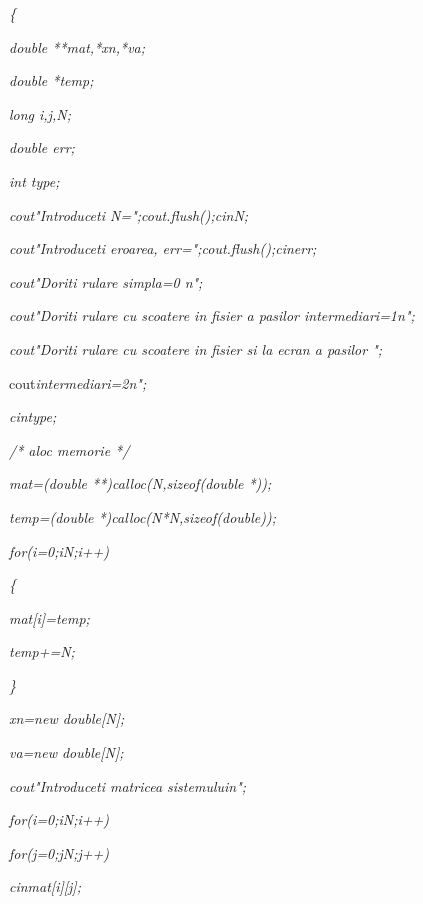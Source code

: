 \documentclass[a4paper,twoside]{book}
\begin{document}
\textit{\{}

\textit{\qquad double **mat,*xn,*va;}

\textit{\qquad double *temp;}

\textit{\qquad long i,j,N;}

\textit{\qquad double err;}

\textit{\qquad int type;}

\textit{\qquad cout\TEXTsymbol{<}\TEXTsymbol{<}"Introduceti
N=";cout.flush();cin\TEXTsymbol{>}\TEXTsymbol{>}N;}

\textit{\qquad cout\TEXTsymbol{<}\TEXTsymbol{<}"Introduceti eroarea,
err=";cout.flush();cin\TEXTsymbol{>}\TEXTsymbol{>}err;}

\textit{\qquad cout\TEXTsymbol{<}\TEXTsymbol{<}"Doriti rulare simpla=0%
\TEXTsymbol{\backslash}n";}

\textit{\qquad cout\TEXTsymbol{<}\TEXTsymbol{<}"Doriti rulare cu scoatere in
fisier a pasilor intermediari=1\TEXTsymbol{\backslash}n";}

\textit{\qquad cout\TEXTsymbol{<}\TEXTsymbol{<}"Doriti rulare cu scoatere in
fisier si la ecran a pasilor ";}

\qquad cout\TEXTsymbol{<}\TEXTsymbol{<}\textit{intermediari=2\TEXTsymbol{%
\backslash}n";}

\textit{\qquad cin\TEXTsymbol{>}\TEXTsymbol{>}type;}

\textit{\qquad /* aloc memorie */}

\textit{\qquad mat=(double **)calloc(N,sizeof(double *));}

\textit{\qquad temp=(double *)calloc(N*N,sizeof(double));}

\textit{\qquad for(i=0;i\TEXTsymbol{<}N;i++)}

\textit{\qquad \{}

\textit{\qquad \qquad mat[i]=temp;}

\textit{\qquad \qquad temp+=N;}

\textit{\qquad \}}

\textit{\qquad xn=new double[N];}

\textit{\qquad va=new double[N];}

\textit{\qquad cout\TEXTsymbol{<}\TEXTsymbol{<}"Introduceti matricea
sistemului\TEXTsymbol{\backslash}n";}

\textit{\qquad for(i=0;i\TEXTsymbol{<}N;i++)}

\textit{\qquad \qquad for(j=0;j\TEXTsymbol{<}N;j++)}

\textit{\qquad \qquad \qquad cin\TEXTsymbol{>}\TEXTsymbol{>}mat[i][j];}
\end{document}
